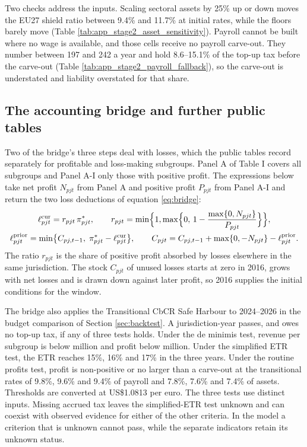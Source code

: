 \documentclass[11pt,a4paper]{article}
\newcommand{\EUR}{\texteuro}
\newcommand{\usd}{US\$}
\begin{document}




Two checks address the inputs. Scaling sectoral assets by 25\% up or down moves the EU27 shield ratio between 9.4\% and 11.7\% at initial rates, while the floors barely move (Table \ref{tab:app_stage2_asset_sensitivity}). Payroll cannot be built where no wage is available, and those cells receive no payroll carve-out. They number between 197 and 242 a year and hold 8.6–15.1\% of the top-up tax before the carve-out (Table \ref{tab:app_stage2_payroll_fallback}), so the carve-out is understated and liability overstated for that share.

\subsection{The accounting bridge and further public tables}\label{app:cbcr_extensions}

Two of the bridge's three steps deal with losses, which the public tables record separately for profitable and loss-making subgroups. Panel A of Table I covers all subgroups and Panel A-I only those with positive profit. The expressions below take net profit $N_{pjt}$ from Panel A and positive profit $P_{pjt}$ from Panel A-I and return the two loss deductions of equation \eqref{eq:bridge}:
\begin{gather}
\ell^{\mathrm{cur}}_{pjt}=r_{pjt}\,\pi^{*}_{pjt},\qquad r_{pjt}=\min\Bigl\{1,\max\Bigl\{0,\,1-\frac{\max\{0,N_{pjt}\}}{P_{pjt}}\Bigr\}\Bigr\},\label{eq:app_lcur}\\
\ell^{\mathrm{prior}}_{pjt}=\min\bigl\{C_{pj,t-1},\;\pi^{*}_{pjt}-\ell^{\mathrm{cur}}_{pjt}\bigr\},\qquad
C_{pjt}=C_{pj,t-1}+\max\{0,-N_{pjt}\}-\ell^{\mathrm{prior}}_{pjt}.\label{eq:app_lprior}
\end{gather}
The ratio $r_{pjt}$ is the share of positive profit absorbed by losses elsewhere in the same jurisdiction. The stock $C_{pjt}$ of unused losses starts at zero in 2016, grows with net losses and is drawn down against later profit, so 2016 supplies the initial conditions for the window.

The bridge also applies the Transitional CbCR Safe Harbour to 2024–2026 in the budget comparison of Section \ref{sec:backtest}. A jurisdiction-year passes, and owes no top-up tax, if any of three tests holds. Under the de minimis test, revenue per subgroup is below \EUR10 million and profit below \EUR1 million. Under the simplified ETR test, the ETR reaches 15\%, 16\% and 17\% in the three years. Under the routine profits test, profit is non-positive or no larger than a carve-out at the transitional rates of 9.8\%, 9.6\% and 9.4\% of payroll and 7.8\%, 7.6\% and 7.4\% of assets. Thresholds are converted at \usd1.0813 per euro. The three tests use distinct inputs. Missing accrued tax leaves the simplified-ETR test unknown and can coexist with observed evidence for either of the other criteria. In the model a criterion that is unknown cannot pass, while the separate indicators retain its unknown status.
\end{document}
